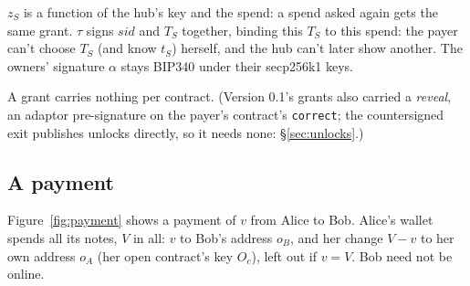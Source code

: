\documentclass[11pt]{article}
\theoremstyle{plain}
\theoremstyle{definition}
\newcommand{\tx}[1]{\texttt{#1}}
\newcommand{\sid}{\mathit{sid}}
\newcommand{\Oc}{O_c}
\begin{document}
$z_S$ is a function of the hub's key and the spend: a spend asked again
gets the same grant. $\tau$ signs $\sid$ and $T_S$ together, binding
this $T_S$ to this spend: the payer can't choose $T_S$ (and know $t_S$)
herself, and the hub can't later show another. The owners' signature
$\alpha$ stays BIP340 under their secp256k1 keys.

A grant carries nothing per contract. (Version 0.1's grants also carried
a \emph{reveal}, an adaptor pre-signature on the payer's contract's
\tx{correct}; the countersigned exit publishes unlocks directly, so it
needs none: \S\ref{sec:unlocks}.)

\subsection{A payment}\label{sec:payment}

Figure~\ref{fig:payment} shows a payment of $v$ from Alice to Bob.
Alice's wallet spends all its notes, $V$ in all: $v$ to Bob's address
$o_B$, and her change $V - v$ to her own address $o_A$ (her open
contract's key $\Oc$), left out if $v = V$. Bob need not be online.
\end{document}
